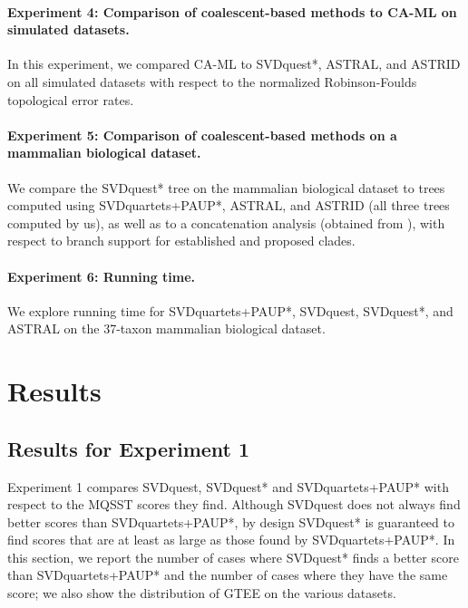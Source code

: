 \paragraph{Experiment 4: Comparison of coalescent-based methods to CA-ML on simulated datasets. }

In this experiment, we compared CA-ML to SVDquest*, ASTRAL, and ASTRID
on all simulated datasets with respect to the normalized
Robinson-Foulds  topological error rates.

\paragraph{Experiment 5: Comparison of coalescent-based methods on a mammalian biological dataset. }

We compare the SVDquest* tree 
on the mammalian biological
dataset to trees computed using SVDquartets+PAUP*,
ASTRAL, and ASTRID (all three trees
computed by us), as well as to a concatenation
analysis (obtained from \cite{ASTRAL}),  with respect to
branch support for established and proposed clades.



\paragraph{Experiment 6: Running time. }
We explore running time for SVDquartets+PAUP*, SVDquest, SVDquest*, and ASTRAL
on the 37-taxon mammalian biological dataset.




\section{Results}


\subsection{Results for Experiment 1}


Experiment 1 compares SVDquest, SVDquest* and SVDquartets+PAUP* with respect to  the MQSST scores they find.
Although SVDquest does not always find better scores than SVDquartets+PAUP*,
by design SVDquest* is guaranteed to find scores that are at least as large as those
found by SVDquartets+PAUP*.
In this section, we report the number of cases where SVDquest* finds a better score than SVDquartets+PAUP* and
the number of cases where they have the same score; we also
show the distribution of GTEE on the various datasets.


